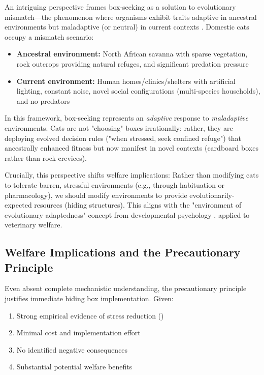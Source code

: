 \documentclass[12pt,a4paper]{article}
\begin{document}
An intriguing perspective frames box-seeking as a solution to evolutionary mismatch—the phenomenon where organisms exhibit traits adaptive in ancestral environments but maladaptive (or neutral) in current contexts \citep{lloyd2015}. Domestic cats occupy a mismatch scenario:

\begin{itemize}
    \item \textbf{Ancestral environment:} North African savanna with sparse vegetation, rock outcrops providing natural refuges, and significant predation pressure
    \item \textbf{Current environment:} Human homes/clinics/shelters with artificial lighting, constant noise, novel social configurations (multi-species households), and no predators
\end{itemize}

In this framework, box-seeking represents an \textit{adaptive} response to \textit{maladaptive} environments. Cats are not "choosing" boxes irrationally; rather, they are deploying evolved decision rules ("when stressed, seek confined refuge") that ancestrally enhanced fitness but now manifest in novel contexts (cardboard boxes rather than rock crevices).

Crucially, this perspective shifts welfare implications: Rather than modifying cats to tolerate barren, stressful environments (e.g., through habituation or pharmacology), we should modify environments to provide evolutionarily-expected resources (hiding structures). This aligns with the "environment of evolutionary adaptedness" concept from developmental psychology \citep{bowlby1969}, applied to veterinary welfare.

\subsection{Welfare Implications and the Precautionary Principle}

Even absent complete mechanistic understanding, the precautionary principle justifies immediate hiding box implementation. Given:

\begin{enumerate}
    \item Strong empirical evidence of stress reduction (\citet{vinke2014})
    \item Minimal cost and implementation effort
    \item No identified negative consequences
    \item Substantial potential welfare benefits
\end{enumerate}
\end{document}
